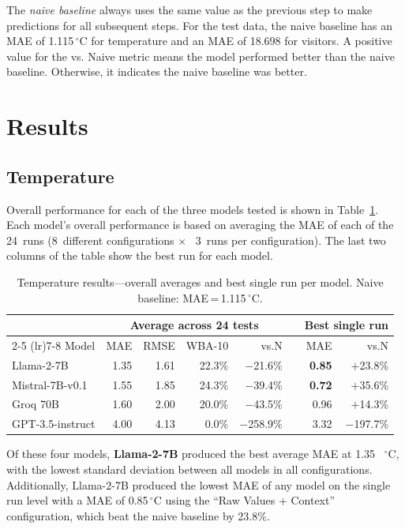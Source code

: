 \documentclass[11pt,a4paper]{article}
\begin{document}
The \emph{naive baseline} always uses the same value as the previous step to make predictions for all subsequent steps. For the test data, the naive baseline has an MAE of 1.115\,$^{\circ}$C for temperature and an MAE of 18.698 for visitors. A positive value for the vs. Naive metric means the model performed better than the naive baseline. Otherwise, it indicates the naive baseline was better.


\section{Results}

\subsection{Temperature}

Overall performance for each of the three models tested is shown in Table~\ref{tab:temp_overall}. Each model's overall performance is based on averaging the MAE of each of the 24~runs (8~different configurations $\times$ ~3~runs per configuration). The last two columns of the table show the best run for each model.

\begin{table}[H]
\centering
\caption{Temperature results---overall averages and best single run per model. Naive baseline: MAE\,=\,1.115\,$^{\circ}$C.}
\label{tab:temp_overall}
\small
\begin{tabular}{l rrrr r rr}
\toprule
 & \multicolumn{4}{c}{Average across 24 tests} & & \multicolumn{2}{c}{Best single run} \\
\cmidrule(lr){2-5} \cmidrule(lr){7-8}
Model & MAE & RMSE & WBA-10 & vs.N & & MAE & vs.N \\
\midrule
Llama-2-7B       & 1.35 & 1.61 & 22.3\% & $-$21.6\% && \textbf{0.85} & $+$23.8\% \\
Mistral-7B-v0.1  & 1.55 & 1.85 & 24.3\% & $-$39.4\% && \textbf{0.72} & $+$35.6\% \\
Groq 70B         & 1.60 & 2.00 & 20.0\% & $-$43.5\% && 0.96 & $+$14.3\% \\
GPT-3.5-instruct & 4.00 & 4.13 &  0.0\% & $-$258.9\% && 3.32 & $-$197.7\% \\
\bottomrule
\end{tabular}
\end{table}

Of these four models, \textbf{Llama-2-7B} produced the best average MAE at 1.35 \, $^{\circ}$C, with the lowest standard deviation between all models in all configurations. Additionally, Llama-2-7B produced the lowest MAE of any model on the single run level with a MAE of 0.85\,$^{\circ}$C using the ``Raw Values + Context'' configuration, which beat the naive baseline by 23.8\%.
\end{document}
